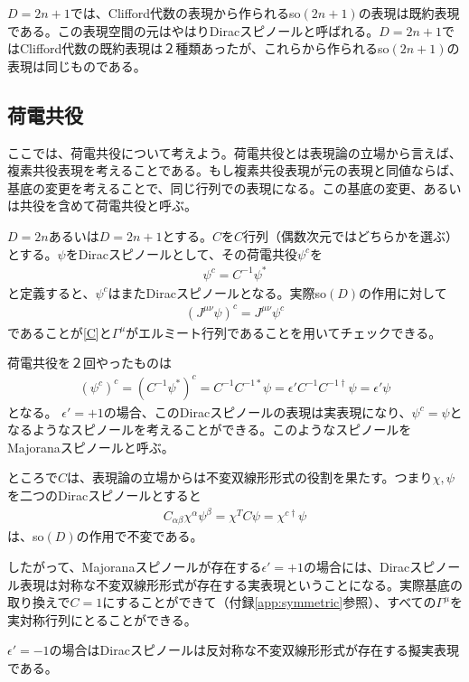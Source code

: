 \documentclass[12pt,a4paper,dvipdfmx]{jlreq}
\begin{document}
$D=2n+1$では、Clifford代数の表現から作られるso$(2n+1)$の表現は既約表現である。この表現空間の元はやはりDiracスピノールと呼ばれる。$D=2n+1$ではClifford代数の既約表現は２種類あったが、これらから作られるso$(2n+1)$の表現は同じものである。

\subsection{荷電共役}
ここでは、荷電共役について考えよう。荷電共役とは表現論の立場から言えば、複素共役表現を考えることである。もし複素共役表現が元の表現と同値ならば、基底の変更を考えることで、同じ行列での表現になる。この基底の変更、あるいは共役を含めて荷電共役と呼ぶ。

$D=2n$あるいは$D=2n+1$とする。$C$を$C$行列（偶数次元ではどちらかを選ぶ）とする。$\psi$をDiracスピノールとして、その荷電共役$\psi^{c}$を
\begin{align}
  \psi^{c}=C^{-1}\psi^{*}\label{charge-conj}
\end{align}
と定義すると、$\psi^{c}$はまたDiracスピノールとなる。実際so$(D)$の作用に対して
\begin{align*}
  (J^{\mu\nu}\psi)^{c}=J^{\mu\nu}\psi^{c}
\end{align*}
であることが\eqref{C}と$\Gamma^{\mu}$がエルミート行列であることを用いてチェックできる。

荷電共役を２回やったものは
\begin{align*}
  (\psi^{c})^c=(C^{-1}\psi^{*})^c
  =C^{-1} C^{-1 *} \psi
  =\epsilon' C^{-1}C^{-1\dag} \psi
  =\epsilon' \psi
\end{align*}
となる。 $\epsilon'=+1$の場合、このDiracスピノールの表現は実表現になり、$\psi^c=\psi$となるようなスピノールを考えることができる。このようなスピノールをMajoranaスピノールと呼ぶ。

ところで$C$は、表現論の立場からは不変双線形形式の役割を果たす。つまり$\chi,\psi$を二つのDiracスピノールとすると
\begin{align*}
  C_{\alpha\beta}\chi^{\alpha}\psi^{\beta}
  =\chi^{T}C\psi=\chi^{c \dag} \psi
\end{align*}
は、so$(D)$の作用で不変である。

したがって、Majoranaスピノールが存在する$\epsilon'=+1$の場合には、Diracスピノール表現は対称な不変双線形形式が存在する実表現ということになる。実際基底の取り換えで$C=1$にすることができて（付録\ref{app:symmetric}参照）、すべての$\Gamma^{\mu}$を実対称行列にとることができる。

$\epsilon'=-1$の場合はDiracスピノールは反対称な不変双線形形式が存在する擬実表現である。
\end{document}
